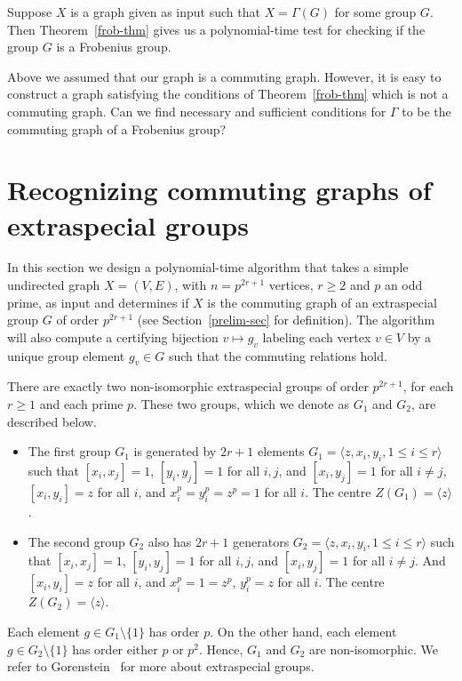 \documentclass{elsarticle}
\renewcommand{\angle}[1]{\langle#1\rangle} %
\begin{document}
Suppose $X$ is a graph given as input such that $X=\Gamma(G)$ for some
group $G$. Then Theorem~\ref{frob-thm} gives us a polynomial-time test
for checking if the group $G$ is a Frobenius group.

\begin{remark}
Above we assumed that our graph is a commuting graph. However, it is easy
to construct a graph satisfying the conditions of Theorem~\ref{frob-thm}
which is not a commuting graph. Can we find necessary and sufficient
conditions for $\Gamma$ to be the commuting graph of a Frobenius group?
\end{remark}

\section{Recognizing commuting graphs of extraspecial groups}\label{extrasp-sec}

In this section we design a polynomial-time algorithm that takes a
simple undirected graph $X=(V,E)$, with $n=p^{2r+1}$ vertices,
$r\ge 2$ and $p$ an odd prime, as input and determines if $X$ is the
commuting graph of an extraspecial group $G$ of order $p^{2r+1}$ (see
Section~\ref{prelim-sec} for definition). The algorithm will also compute a
certifying bijection $v\mapsto g_v$ labeling each vertex $v\in V$ by a
unique group element $g_v\in G$ such that the commuting relations
hold.

There are exactly two non-isomorphic extraspecial groups of order
$p^{2r+1}$, for each $r\ge 1$ and each prime $p$. These two groups,
which we denote as $G_1$ and $G_2$, are described below.

\begin{itemize}
\item The first group $G_1$ is generated by $2r+1$ elements
  $G_1=\angle{z,x_i,y_i, 1\le i\le r}$ such that $[x_i,x_j]=1$,
  $[y_i,y_j]=1$ for all $i, j$, and $[x_i,y_j]=1$ for all $i\ne
  j$, $[x_i,y_i]=z$ for all $i$, and $x_i^p=y_i^p=z^p=1$ for all
  $i$. The centre $Z(G_1)=\angle{z}$.

\item The second group $G_2$ also has $2r+1$ generators
  $G_2=\angle{z,x_i,y_i, 1\le i\le r}$ such that $[x_i,x_j]=1$,
  $[y_i,y_j]=1$ for all $i, j$, and $[x_i,y_j]=1$ for all $i\ne
  j$. And $[x_i,y_i]=z$ for all $i$, and $x_i^p=1=z^p$, $y_i^p=z$ for
  all $i$. The centre $Z(G_2)=\angle{z}$.
\end{itemize}

Each element $g\in G_1\setminus \{1\}$ has order $p$. On the other
hand, each element $g\in G_2\setminus \{1\}$ has order either $p$ or
$p^2$. Hence, $G_1$ and $G_2$ are non-isomorphic.
We refer to Gorenstein~\cite[Chapter 5]{Gorenstein} for more about
extraspecial groups.
\end{document}
